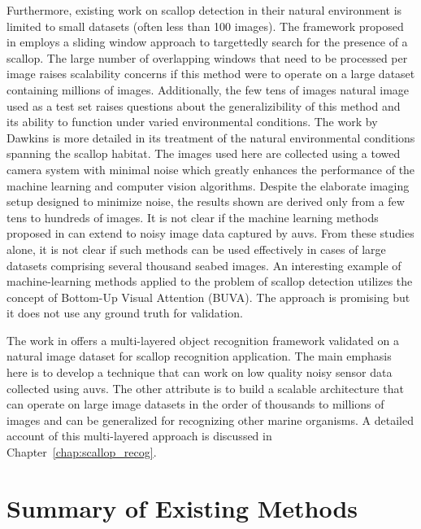 \documentclass {udthesis}
\begin{document}
Furthermore,  existing work on scallop detection \cite{dawkings13, guomundsson} in their natural
environment is limited to small datasets (often less than 100 images). 
The framework proposed in \cite{guomundsson} employs a sliding window approach to targettedly search for the presence of a scallop. The large number of overlapping windows that need to be processed per image raises scalability concerns if this method were to operate 
on a large dataset containing millions of images. Additionally, the few tens of images natural image used as a test set raises questions about the generalizibility of this method and its ability to function under varied environmental conditions.
The work by Dawkins \cite{dawkings13} is more detailed in its treatment of the natural environmental conditions spanning the scallop habitat. The images used here are collected using a towed camera system with minimal noise which greatly enhances the performance of the machine learning and computer vision algorithms. Despite the elaborate imaging setup designed to minimize noise, the results shown are derived only from a few tens to hundreds of images.
It is not clear if the machine learning methods proposed in \cite{dawkings13} can extend to noisy image data captured by \gls{auv}s.
From these studies alone, it is not clear if such methods can be used effectively
in cases of large datasets comprising several thousand seabed images.
An interesting example of machine-learning methods applied to the
problem of scallop detection \cite{fearn} 
utilizes the concept of Bottom-Up Visual Attention (BUVA).
The approach is promising but it does not use any ground truth for validation.  

The work in \cite{prasanna_med, prasanna_aslo, prasanna_igi} offers a multi-layered object recognition framework validated on
a natural image dataset for scallop recognition application. 
The main emphasis here is to develop a technique that can work on low quality noisy sensor data collected using \gls{auv}s.
The other attribute is to build a scalable architecture that can operate on 
large image datasets in the order of thousands to millions of images
and can be generalized for recognizing other marine organisms.
A detailed account of this multi-layered approach is discussed in Chapter~\ref{chap:scallop_recog}.


\section{Summary of Existing Methods}
\end{document}
